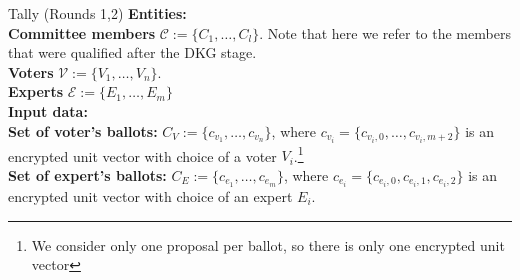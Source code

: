 \begin{boxfig}{\label{fig:tally1}Tally (Rounds 1,2)}{}
\footnotesize
\textbf{Entities:}\\
    \hspace*{6mm} \textbf{Committee members} $\mathcal{C}:=\{C_1,\ldots, C_l \}$. Note that here we refer to the members that were qualified after the DKG stage.\\
    \hspace*{6mm} \textbf{Voters} $\mathcal{V}:=\{V_1,\ldots, V_n \}$.\\
    \hspace*{6mm} \textbf{Experts} $\mathcal{E}:=\{E_1,\ldots, E_m \}$\\

\textbf{Input data:}\\
    \hspace*{6mm} \textbf{Set of voter's ballots:} $C_V:=\{c_{v_1},\ldots, c_{v_n} \}$, where $c_{v_i}=\{c_{v_i,0},\ldots,c_{v_i,m+2}\}$ is an encrypted unit vector with choice of a voter $V_i$.\footnote{\label{note1}We consider only one proposal per ballot, so there is only one encrypted unit vector}\\
    \hspace*{6mm} \textbf{Set of expert's ballots:} $C_E:=\{c_{e_1},\ldots, c_{e_m} \}$, where $c_{e_i}=\{c_{e_i,0},c_{e_i,1},c_{e_i,2}\}$ is an encrypted unit vector with choice of an expert $E_i$.\\


\end{boxfig}
